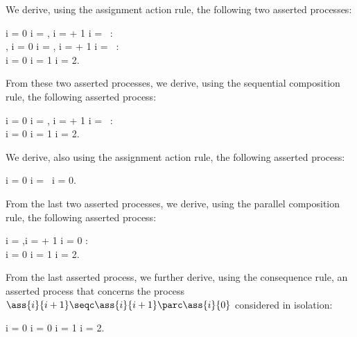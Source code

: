 \documentclass[runningheads]{llncs}
\begin{document}
We derive, using the assignment action rule, the following two asserted
processes:
\begin{ldispl}
\langle i = 0 \Lor i = ,
        i =  + 1 \Lor i = \, \rangle :
\\ \qquad
{}\;,
\eqnsep
\langle i = 0 \Lor i = ,
        i =  + 1 \Lor i = \, \rangle :
\\ \qquad
{}
  {i = 0 \Lor i = 1 \Lor i = 2}\;.
\end{ldispl}%
From these two asserted processes, we derive, using the sequential 
composition rule, the following asserted process:
\begin{ldispl}
\langle i = 0 \Lor i = ,
        i =  + 1 \Lor i = \, \rangle :
\\ \qquad
{}
  {i = 0 \Lor i = 1 \Lor i = 2}\;.
\end{ldispl}%
We derive, also using the assignment action rule, the following asserted
process:
\begin{ldispl}
  {i = 0 \Lor i = \,}
  {i = 0}{}{\True}\;.
\end{ldispl}%
From the last two asserted processes, we derive, using the parallel 
composition rule, the following asserted process:
\begin{ldispl}
\langle i = ,i =  + 1 \Lor i = 0 \rangle : 
\\ \qquad
{}
  {i = 0 \Lor i = 1 \Lor i = 2}\;.
\end{ldispl}%

From the last asserted process, we further derive, using the consequence 
rule, an asserted process that concerns the process 
$\ass{i}{i+1} \seqc \ass{i}{i+1} \parc \ass{i}{0}$ 
considered in isolation:
\begin{ldispl}
\assproc{\False}{\True}
  {i = 0}{ \seqc {} \parc {}}
  {i = 0 \Lor i = 1 \Lor i = 2}\;.
\end{ldispl}%
\end{document}
